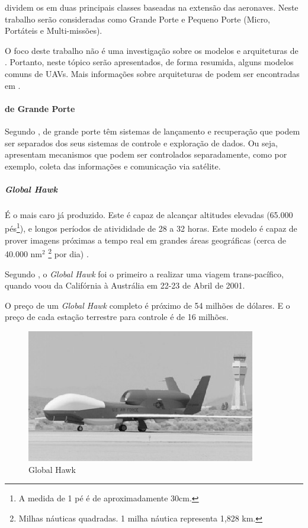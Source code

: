 \cite{Drew2005} dividem os \vants em duas principais classes baseadas na extensão das aeronaves. Neste trabalho serão consideradas como Grande Porte e Pequeno Porte (Micro, Portáteis e Multi-missões).

O foco deste trabalho não é uma investigação sobre os modelos e arquiteturas de \vants. Portanto,  neste tópico serão apresentados, de forma resumida, alguns modelos comuns de UAVs. Mais informações sobre arquiteturas de \vants podem ser encontradas em \cite{Drew2005,uav_roadmap2005, Bone2003,Holder2001}.

\addtocounter{footnote}{1}

\paragraph{\vants de Grande Porte}
Segundo \cite{Drew2005}, \vants de grande porte têm sistemas de lançamento e recuperação que podem ser separados dos seus sistemas de controle e exploração de dados. Ou seja, apresentam mecanismos que podem ser controlados separadamente, como por exemplo, coleta das informações e comunicação via satélite.



 \subparagraph{\emph{Global Hawk} }

 É o \vant mais caro já produzido. Este \vant é capaz de alcançar altitudes elevadas (65.000 pés\footnote{A medida de 1 pé é de aproximadamente 30cm.}), e longos períodos de ativididade de 28 a 32 horas. Este modelo é capaz de prover imagens próximas a tempo real em grandes áreas geográficas (cerca de 40.000 nm$^{2}$ \footnote{Milhas náuticas quadradas. 1 milha náutica representa 1,828 km.} por dia) \cite{uav_roadmap2005}.

Segundo \cite{Drew2005}, o \emph{Global Hawk} foi o primeiro \vant a realizar uma viagem trans-pacífico, quando voou da Califórnia à Austrália em 22-23 de Abril de 2001.

O preço de um \emph{Global Hawk} completo é próximo de 54 milhões de dólares. E o preço de cada estação terrestre para controle
é de 16 milhões.

\begin{figure}[h!]
\centering
\includegraphics[width=10cm]{pictures/global_hawk.png}
\caption{Global Hawk}
 \label{fig:global_hawk}
\end{figure}



